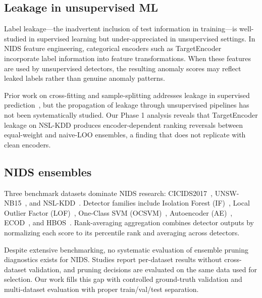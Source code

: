 \subsection{Leakage in unsupervised ML}

Label leakage---the inadvertent inclusion of test information in training---is well-studied in supervised learning but under-appreciated in unsupervised settings. In NIDS feature engineering, categorical encoders such as TargetEncoder incorporate label information into feature transformations. When these features are used by unsupervised detectors, the resulting anomaly scores may reflect leaked labels rather than genuine anomaly patterns.

Prior work on cross-fitting and sample-splitting addresses leakage in supervised prediction~\cite{benjamini1995controlling}, but the propagation of leakage through unsupervised pipelines has not been systematically studied. Our Phase 1 analysis reveals that TargetEncoder leakage on NSL-KDD produces encoder-dependent ranking reversals between equal-weight and naive-LOO ensembles, a finding that does not replicate with clean encoders.

\subsection{NIDS ensembles}

Three benchmark datasets dominate NIDS research: CICIDS2017~\cite{mollmark2021nids}, UNSW-NB15~\cite{moustafa2015unsw}, and NSL-KDD~\cite{tavallaee2009nsl}. Detector families include Isolation Forest (IF)~\cite{liu2012isolation}, Local Outlier Factor (LOF)~\cite{breunig2000lof}, One-Class SVM (OCSVM)~\cite{scholkopf2001estimating}, Autoencoder (AE)~\cite{kingma2014autoencoding}, ECOD~\cite{li2019ecod}, and HBOS~\cite{aggarwal2015outlier}. Rank-averaging aggregation combines detector outputs by normalizing each score to its percentile rank and averaging across detectors.

Despite extensive benchmarking, no systematic evaluation of ensemble pruning diagnostics exists for NIDS. Studies report per-dataset results without cross-dataset validation, and pruning decisions are evaluated on the same data used for selection. Our work fills this gap with controlled ground-truth validation and multi-dataset evaluation with proper train/val/test separation.

